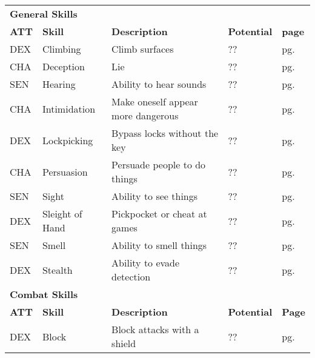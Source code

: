 




\begin{multicols*}{2}
    \begin{table*}[ht]
        \unclassedrowcolors
        \begin{tabularx}{\textwidth}{l l X l l}
            \multicolumn{5}{l}{\bfseries{General Skills}} \\
            \bfseries{ATT} & \bfseries{Skill} & \bfseries{Description} & \bfseries{Potential} & \bfseries{page} \\
            DEX & Climbing & Climb surfaces & ?? & pg. \pageref{skill:climbing} \\
            CHA & Deception & Lie & ?? & pg. \pageref{skill:deception} \\
            SEN & Hearing & Ability to hear sounds & ?? & pg. \pageref{skill:hearing} \\
            CHA & Intimidation & Make oneself appear more dangerous & ?? & pg. \pageref{skill:intimidation} \\
            DEX & Lockpicking & Bypass locks without the key & ?? & pg. \pageref{skill:lockpicking} \\
            CHA & Persuasion & Persuade people to do things & ?? & pg. \pageref{skill:persuasion} \\
            SEN & Sight & Ability to see things & ?? & pg. \pageref{skill:sight} \\
            DEX & Sleight of Hand & Pickpocket or cheat at games & ?? & pg. \pageref{skill:sleight-of-hand} \\
            SEN & Smell & Ability to smell things & ?? & pg. \pageref{skill:smell} \\
            DEX & Stealth & Ability to evade detection & ?? & pg. \pageref{skill:stealth} \\
            \multicolumn{5}{l}{\bfseries{Combat Skills}} \\
            \bfseries{ATT} & \bfseries{Skill} & \bfseries{Description} & \bfseries{Potential} & \bfseries{Page} \\
            DEX & Block & Block attacks with a shield & ?? & pg. \pageref{skill:block} \\

\end{tabularx}
\end{table*}
\end{multicols*}
